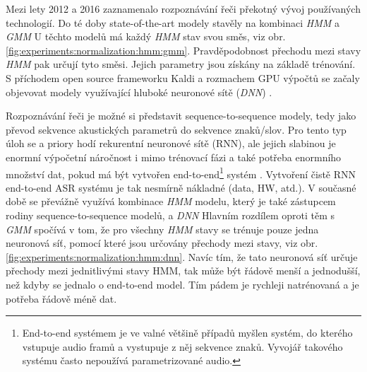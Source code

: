 Mezi lety 2012 a 2016 zaznamenalo rozpoznávání řeči překotný vývoj používaných technologií. Do té doby state-of-the-art modely stavěly na kombinaci \textit{HMM} a  \textit{GMM}  U těchto modelů má každý \textit{HMM} stav svou směs, viz obr. \ref{fig:experiments:normalization:hmm:gmm}. Pravděpodobnost přechodu mezi stavy \textit{HMM} pak určují tyto směsi. Jejich parametry jsou získány na základě trénování. S příchodem open source frameworku Kaldi \cite{Kaldi2011} a rozmachem GPU výpočtů se začaly objevovat modely využívající hluboké neuronové sítě (\textit{DNN}) .

Rozpoznávání řeči je možné si představit sequence-to-sequence modely, tedy jako převod sekvence akustických parametrů do sekvence znaků/slov. Pro tento typ úloh se a priory hodí rekurentní neuronové sítě (RNN), ale jejich slabinou je enormní výpočetní náročnost i mimo trénovací fázi a také potřeba enormního množství dat, pokud má být vytvořen end-to-end\footnote{End-to-end systémem je ve valné většině případů myšlen systém, do kterého vstupuje audio framů a  vystupuje z něj sekvence znaků. Vyvojář takového systému často nepoužívá parametrizované audio.} systém \cite{Hannun2014}. Vytvoření čistě RNN end-to-end ASR systému je tak nesmírně nákladné (data, HW, atd.). V současné době se převážně využívá kombinace \textit{HMM} modelu, který je také zástupcem rodiny sequence-to-sequence modelů, a \textit{DNN}  Hlavním rozdílem oproti těm s \textit{GMM} spočívá v tom, že pro všechny \textit{HMM} stavy se trénuje pouze jedna neuronová síť, pomocí které jsou určovány přechody mezi stavy, viz obr. \ref{fig:experiments:normalization:hmm:dnn}. Navíc tím, že tato neuronová síť určuje  přechody mezi jednitlivými stavy HMM, tak může být řádově menší a jednodušší, než kdyby se jednalo o end-to-end model. Tím pádem je rychleji natrénovaná a je potřeba řádově méně dat.


